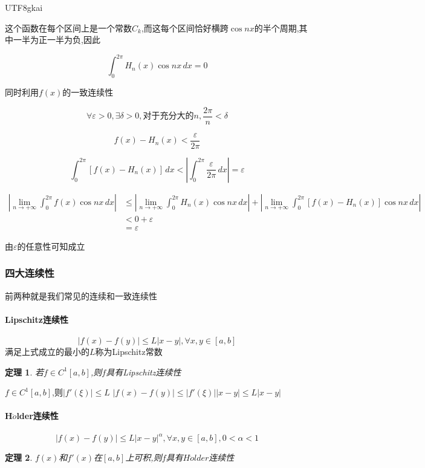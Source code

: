 \documentclass{article}
\newtheorem{theorem}{定理}[subsection]
\newenvironment{cproof}{%
\heiti{证明}\kaishu
}{%
}
\newcommand{\bracket}[1]{\left[#1\right]}
\newcommand{\abs}[1]{\left|#1\right|}
\begin{document}
\begin{CJK}{UTF8}{gkai}
\begin{cproof}
这个函数在每个区间上是一个常数$C_k$,而这每个区间恰好横跨$\cos nx$的半个周期,其中一半为正一半为负,因此

\[\int_{0}^{2 \pi} H_n(x) \cos nx \, dx = 0\]

同时利用$f(x)$的一致连续性

\[\forall \varepsilon> 0 ,\exists \delta > 0,\text{对于充分大的}n,\dfrac{2\pi}{n} < \delta\]

\[f(x) - H_n(x) < \dfrac{\varepsilon}{2 \pi}\]

\[\int_{0}^{2 \pi}\bracket{f(x) - H_n(x)}\, dx < |\int_{0}^{2 \pi}\dfrac{\varepsilon}{2 \pi}\,dx| = \varepsilon\]

\[
\begin{aligned}
  \abs{\lim_{n \to +\infty} \int_{0}^{2 \pi} f(x)\cos nx \, dx} &\leq \abs{\lim_{n \to +\infty} \int_{0}^{2 \pi} H_n(x)\cos nx \, dx} + \abs{\lim_{n \to +\infty} \int_{0}^{2 \pi} \bracket{f(x) - H_n(x)}\cos nx \, dx}\\
  &< 0 + \varepsilon\\
  &= \varepsilon
\end{aligned}  
\]

由$\varepsilon$的任意性可知成立
\end{cproof}


\subsubsection{四大连续性}
前两种就是我们常见的连续和一致连续性

\paragraph{Lipschitz连续性}
\[\abs{f(x) - f(y)} \leq L|x - y|,\forall x,y \in [a,b]\]
满足上式成立的最小的$L$称为Lipschitz常数
\begin{theorem}
  若$f\in C^1[a,b]$,则$f$具有Lipschitz连续性
\end{theorem}
\begin{cproof}
$f\in C^1[a,b]$,则$ \abs{f'(\xi)} \leq L$
$\abs{f(x) - f(y)} \leq \abs{f'(\xi)}|x - y|\leq L|x - y|$
\end{cproof}
\paragraph{H$\ddot{o}$lder连续性}

\[\abs{f(x) - f(y)} \leq L|x - y|^{\alpha},\forall x,y \in [a,b],0 < \alpha < 1\]


\begin{theorem}
  $f(x)$和$f'(x)$在$[a,b]$上可积,则$f$具有$H\ddot{o}lder$连续性
\end{theorem}


\end{CJK}
\end{document}
